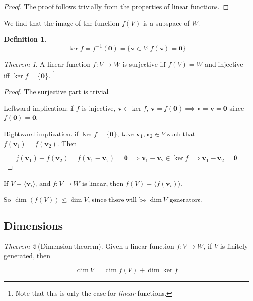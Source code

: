 \documentclass[12pt,a4paper]{report}
\numberwithin{equation}{section}
\theoremstyle{definition}
\newtheorem{definition}{Definition}[section]
\theoremstyle{remark}
\newtheorem{theorem}{Theorem}[section]
\begin{document}
\begin{proof}
The proof follows trivially from the properties of linear functions.
\end{proof}

We find that the image of the function $f(V)$ is a subspace of $W$.

\begin{definition}
\begin{equation}
\ker f = f^{-1} (\mathbf{0}) = \lbrace \mathbf{v} \in V : f(\mathbf{v}) = \mathbf{0}\rbrace
\end{equation}
\end{definition}

\begin{theorem}
A linear function $f: V \rightarrow W$ is surjective iff $f(V) = W$ and injective iff $\ker f = \lbrace \mathbf{0}\rbrace$. \footnote{Note that this is only the case for \emph{linear} functions.}
\end{theorem}

\begin{proof}
The surjective part is trivial.

Leftward implication: if $f$ is injective,  $\mathbf{v} \in \ker f$, $\mathbf{v} = f(\mathbf{0}) \implies \mathbf{v} = \mathbf{v} = \mathbf{0}$ since $f(\mathbf{0}) = \mathbf{0}$.

Rightward implication: if $\ker f = \lbrace \mathbf{0}\rbrace$, take $\mathbf{v}_1, \mathbf{v}_2 \in V$ such that $f(\mathbf{v}_1) = f(\mathbf{v}_2)$. Then

\begin{equation}
f(\mathbf{v}_1) - f(\mathbf{v}_2) = f(\mathbf{v}_1 - \mathbf{v}_2) = \mathbf{0} \implies
\mathbf{v}_1 - \mathbf{v}_2 \in \ker f \implies \mathbf{v}_1 - \mathbf{v}_2 = \mathbf{0}
\end{equation}
\end{proof}

If $V = \langle \mathbf{v}_i \rangle$, and $f: V \rightarrow W $ is linear, then $f(V) = \langle f(\mathbf{v}_i) \rangle$.

So $\dim (f(V) ) \leq \dim V$, since there will be $\dim V$ generators.

\subsection{Dimensions}

\begin{theorem}[Dimension theorem]
Given a linear function $f: V\rightarrow W$, if $V$ is finitely generated, then

\begin{equation}
\dim V = \dim f(V) + \dim \ker f
\end{equation}
\end{theorem}
\end{document}

